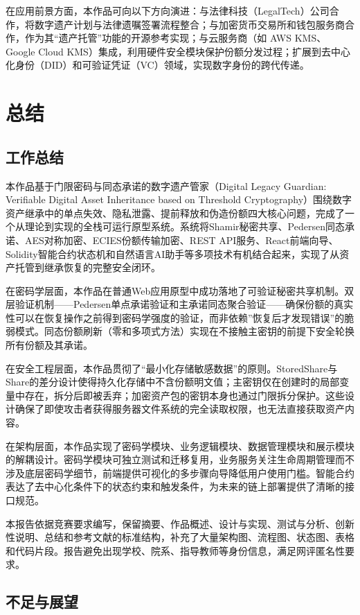 \documentclass[UTF8,a4paper,zihao=-4,openany]{ctexrep}
\newcommand{\project}{基于门限密码与同态承诺的数字遗产管家}
\newcommand{\englishname}{Digital Legacy Guardian: Verifiable Digital Asset Inheritance based on Threshold Cryptography}
\begin{document}
在应用前景方面，本作品可向以下方向演进：与法律科技（LegalTech）公司合作，将数字遗产计划与法律遗嘱签署流程整合；与加密货币交易所和钱包服务商合作，作为其“遗产托管”功能的开源参考实现；与云服务商（如 AWS KMS、Google Cloud KMS）集成，利用硬件安全模块保护份额分发过程；扩展到去中心化身份（DID）和可验证凭证（VC）领域，实现数字身份的跨代传递。

\chapter{总结}

\section{工作总结}

本作品\project（\englishname）围绕数字资产继承中的单点失效、隐私泄露、提前释放和伪造份额四大核心问题，完成了一个从理论到实现的全栈可运行原型系统。系统将Shamir秘密共享、Pedersen同态承诺、AES对称加密、ECIES份额传输加密、REST API服务、React前端向导、Solidity智能合约状态机和自然语言AI助手等多项技术有机结合起来，实现了从资产托管到继承恢复的完整安全闭环。

在密码学层面，本作品在普通Web应用原型中成功落地了可验证秘密共享机制。双层验证机制——Pedersen单点承诺验证和主承诺同态聚合验证——确保份额的真实性可以在恢复操作之前得到密码学强度的验证，而非依赖”恢复后才发现错误”的脆弱模式。同态份额刷新（零和多项式方法）实现在不接触主密钥的前提下安全轮换所有份额及其承诺。

在安全工程层面，本作品贯彻了“最小化存储敏感数据”的原则。StoredShare与Share的差分设计使得持久化存储中不含份额明文值；主密钥仅在创建时的局部变量中存在，拆分后即被丢弃；加密资产包的密钥本身也通过门限拆分保护。这些设计确保了即使攻击者获得服务器文件系统的完全读取权限，也无法直接获取资产内容。

在架构层面，本作品实现了密码学模块、业务逻辑模块、数据管理模块和展示模块的解耦设计。密码学模块可独立测试和迁移复用，业务服务关注生命周期管理而不涉及底层密码学细节，前端提供可视化的多步骤向导降低用户使用门槛。智能合约表达了去中心化条件下的状态约束和触发条件，为未来的链上部署提供了清晰的接口规范。

本报告依据竞赛要求编写，保留摘要、作品概述、设计与实现、测试与分析、创新性说明、总结和参考文献的标准结构，补充了大量架构图、流程图、状态图、表格和代码片段。报告避免出现学校、院系、指导教师等身份信息，满足网评匿名性要求。

\section{不足与展望}
\end{document}
